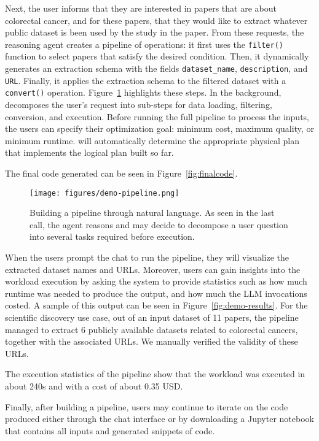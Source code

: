 Next, the user informs \chat{} that they are interested in papers that are about colorectal cancer, and for these papers, that they would like to extract whatever public dataset is been used by the study in the paper.
From these requests, the reasoning agent creates a pipeline of \sys{} operations: it first uses the \texttt{filter()} function to select papers that satisfy the desired condition.
Then, it dynamically generates an extraction schema with the fields \texttt{dataset\_name}, \texttt{description}, and \texttt{URL}.
Finally, it applies the extraction schema to the filtered dataset with a \texttt{convert()} operation.
Figure~\ref{fig:chat-extract} highlights these steps. 
In the background, \chat{} decomposes the user’s request into sub-steps for data loading, filtering, conversion, and execution.
Before running the full pipeline to process the inputs, the users can specify their optimization goal: minimum cost, maximum quality, or minimum runtime.
\sys{} will automatically determine the appropriate physical plan that implements the logical plan built so far.

The final code generated can be seen in Figure~\ref{fig:finalcode}.

\begin{figure}[t]
    \centering
    \texttt{[image: figures/demo-pipeline.png]}
    \caption{Building a pipeline through natural language. As seen in the last call, the agent reasons and may decide to decompose a user question into several tasks required  before execution.}
    \label{fig:chat-extract}
\end{figure}

When the users prompt the chat to run the pipeline, they will visualize the extracted dataset names and URLs.
Moreover, users can gain insights into the workload execution by asking the system to provide statistics such as how much runtime was needed to produce the output, and how much the LLM invocations costed.
A sample of this output can be seen in Figure~\ref{fig:demo-results}.
For the scientific discovery use case, out of an input dataset of 11 papers, the pipeline managed to extract 6 publicly available datasets related to colorectal cancers, together with the associated URLs.
We manually verified the validity of these URLs.

The execution statistics of the pipeline show that the workload was executed in about 240s and with a cost of about 0.35 USD.

Finally, after building a pipeline, users may continue to iterate on the code produced either through the chat interface or by downloading a Jupyter notebook that contains all inputs and generated snippets of code.


